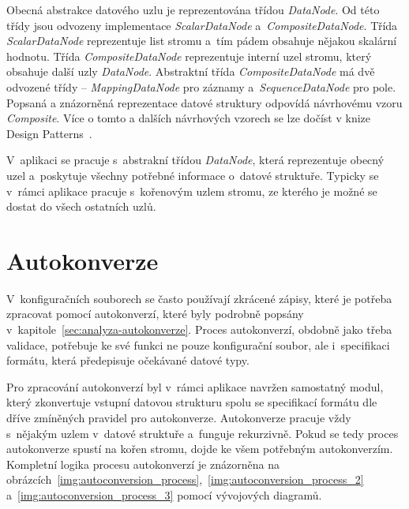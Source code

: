 \documentclass[FM,bw,DP]{tulthesis}
\begin{document}
Obecná abstrakce datového uzlu je reprezentována třídou \textit{DataNode}. Od této třídy jsou odvozeny implementace \textit{ScalarDataNode} a~\textit{CompositeDataNode}. Třída \textit{ScalarDataNode} reprezentuje list stromu a~tím pádem obsahuje nějakou skalární hodnotu. Třída \textit{CompositeDataNode} reprezentuje interní uzel stromu, který obsahuje další uzly \textit{DataNode}. Abstraktní třída \textit{CompositeDataNode} má dvě odvozené třídy -- \textit{MappingDataNode} pro záznamy a~\textit{SequenceDataNode} pro pole. Popsaná a znázorněná reprezentace datové struktury odpovídá návrhovému vzoru \textit{Composite}. Více o tomto a dalších návrhových vzorech se lze dočíst v knize Design Patterns~\cite{bib:design-patterns}.

V~aplikaci se pracuje s~abstrakní třídou \textit{DataNode}, která reprezentuje obecný uzel a~poskytuje všechny potřebné informace o~datové struktuře. Typicky se v~rámci aplikace pracuje s~kořenovým uzlem stromu, ze kterého je možné se dostat do všech ostatních uzlů.

\section{Autokonverze}

V~konfiguračních souborech se často používají zkrácené zápisy, které je potřeba zpracovat pomocí autokonverzí, které byly podrobně popsány v~kapitole~\ref{sec:analyza-autokonverze}. Proces autokonverzí, obdobně jako třeba validace, potřebuje ke své funkci ne pouze konfigurační soubor, ale i~specifikaci formátu, která předepisuje očekávané datové typy.

Pro zpracování autokonverzí byl v~rámci aplikace navržen samostatný modul, který zkonvertuje vstupní datovou strukturu spolu se specifikací formátu dle dříve zmíněných pravidel pro autokonverze. Autokonverze pracuje vždy s~nějakým uzlem v~datové struktuře a~funguje rekurzivně. Pokud se tedy proces autokonverze spustí na kořen stromu, dojde ke všem potřebným autokonverzím. Kompletní logika procesu autokonverzí je znázorněna na obrázcích~\ref{img:autoconversion_process},~\ref{img:autoconversion_process_2}  a~\ref{img:autoconversion_process_3} pomocí vývojových diagramů. 
\end{document}
